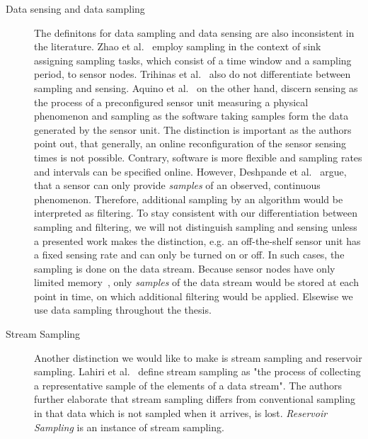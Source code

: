 \begin{description}
    \item[Data sensing and data sampling] 
        The definitons for data sampling and data sensing are also inconsistent
        in the literature. Zhao et al.~\cite{zhao2016cats} employ sampling in
        the context of sink assigning sampling tasks, which consist of a time
        window and a sampling period, to sensor nodes. Trihinas et
        al.~\cite{trihinas2015adam} also do not differentiate between sampling
        and sensing.  Aquino et al.~\cite{aquino2014musa} on the other hand,
        discern sensing as the process of a preconfigured sensor unit measuring
        a physical phenomenon and sampling as the software taking samples form
        the data generated by the sensor unit. The distinction is important as
        the authors point out, that generally, an online reconfiguration of the
        sensor sensing times is not possible. Contrary, software is more
        flexible and sampling rates and intervals can be specified online.
        However, Deshpande et al.~\cite{deshpande2004model} argue, that a
        sensor can only provide \textit{samples} of an observed, continuous
        phenomenon. Therefore, additional sampling by an algorithm would be
        interpreted as filtering. To stay consistent with our differentiation
        between sampling and filtering, we will not distinguish sampling and
        sensing unless a presented work makes the distinction, e.g. an
        off-the-shelf sensor unit has a fixed sensing rate and can only be
        turned on or off. In such cases, the sampling is done on the data
        stream. Because sensor nodes have only limited
        memory~\cite{akyildiz2002wireless}, only \textit{samples} of the data
        stream would be stored at each point in time, on which additional
        filtering would be applied. Elsewise we use data sampling throughout
        the thesis.

    \item[Stream Sampling]
        Another distinction we would like to make is stream sampling and
        reservoir sampling. Lahiri et al.~\cite{Lahiri2009} define stream
        sampling as "the process of collecting a representative sample of the
        elements of a data stream". The authors further elaborate that stream
        sampling differs from conventional sampling in that data which is not
        sampled when it arrives, is lost. \textit{Reservoir Sampling} is an
        instance of stream sampling. 



\end{description}
\par

